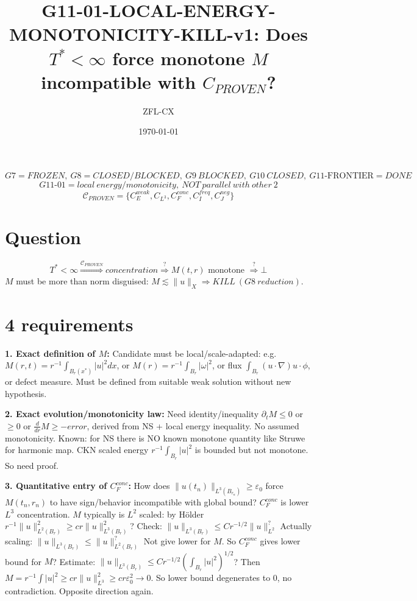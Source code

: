 \documentclass[11pt]{article}
\begin{document}
\title{G11-01-LOCAL-ENERGY-MONOTONICITY-KILL-v1: Does $T^*<\infty$ force monotone $M$ incompatible with $C_{PROVEN}$?}
\author{ZFL-CX}\date{\today}\maketitle

\[
\boxed{G7=FROZEN,\ G8=CLOSED/BLOCKED,\ G9\ BLOCKED,\ G10\ CLOSED,\ G11\text{-FRONTIER}=DONE}
\]
\[
\boxed{G11\text{-}01 = local\ energy/monotonicity,\ NOT\ parallel\ with\ other\ 2}
\]
\[
\boxed{\mathcal C_{PROVEN}=\{C_E^{weak},C_{L^3},C_F^{conc},C_I^{freq},C_J^{neg}\}}
\]

\section{Question}
\[
T^*<\infty \overset{\mathcal C_{PROVEN}}{\Longrightarrow} concentration \overset{?}{\Longrightarrow} M(t,r) \text{ monotone } \overset{?}{\Longrightarrow}\bot
\]
$M$ must be more than norm disguised: $\boxed{M\lesssim\|u\|_X \Rightarrow KILL\ (G8\ reduction)}$.

\section{4 requirements}

\textbf{1. Exact definition of $M$:} Candidate must be local/scale-adapted:
e.g. $M(r,t)=r^{-1}\int_{B_r(x^*)}|u|^2dx$, or $M(r)=r^{-1}\int_{B_r}|\omega|^2$, or flux $ \int_{B_r} (u\cdot\nabla)u\cdot\phi$, or defect measure.
Must be defined from suitable weak solution without new hypothesis.

\textbf{2. Exact evolution/monotonicity law:} Need identity/inequality $\partial_t M\le 0$ or $\ge0$ or $\frac{d}{dr}M\ge -error$, derived from NS + local energy inequality. No assumed monotonicity. Known: for NS there is NO known monotone quantity like Struwe for harmonic map. CKN scaled energy $r^{-1}\int_{B_r}|u|^2$ is bounded but not monotone. So need proof.

\textbf{3. Quantitative entry of $C_F^{conc}$:} How does $\|u(t_n)\|_{L^3(B_{r_n})}\ge\varepsilon_0$ force $M(t_n,r_n)$ to have sign/behavior incompatible with global bound? $C_F^{conc}$ is lower $L^3$ concentration. $M$ typically is $L^2$ scaled: by H\"older $r^{-1}\|u\|_{L^2(B_r)}^2\ge c r\|u\|_{L^3(B_r)}^2$? Check: $\|u\|_{L^3(B_r)}\le C r^{-1/2}\|u\|_{L^2}^{?}$ Actually scaling: $\|u\|_{L^3(B_r)}\le \|u\|_{L^2(B_r)}^{?}$ Not give lower for $M$. So $C_F^{conc}$ gives lower bound for $M$? Estimate: $\|u\|_{L^3(B_r)}\le C r^{-1/2} (\int_{B_r}|u|^2)^{1/2}$? Then $M=r^{-1}\int|u|^2\ge c r\|u\|_{L^3}^2\ge c r\varepsilon_0^2\to0$. So lower bound degenerates to 0, no contradiction. Opposite direction again.
\end{document}

